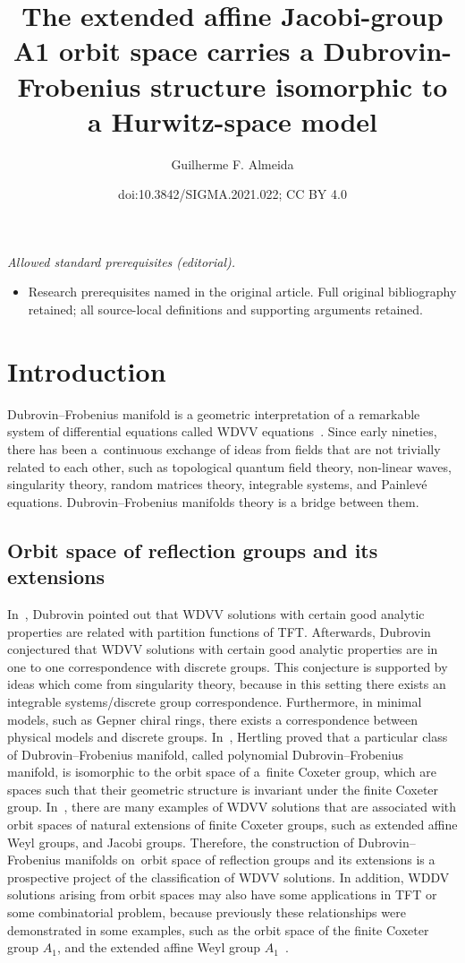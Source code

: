 \documentclass[10pt,a4paper]{amsart}
\title{The extended affine Jacobi-group A1 orbit space carries a Dubrovin-Frobenius structure isomorphic to a Hurwitz-space model}
\author{Guilherme F. Almeida}
\date{doi:10.3842/SIGMA.2021.022; CC BY 4.0}
\numberwithin{equation}{section}
\begin{document}
\maketitle
\noindent\textit{Allowed standard prerequisites (editorial).}\begin{itemize}
\item Research prerequisites named in the original article. Full original bibliography retained; all source-local definitions and supporting arguments retained.
\end{itemize}\medskip
\section{Introduction}
 Dubrovin--Frobenius manifold is a geometric interpretation of a remarkable system of differential equations called WDVV equations~\cite{B.Dubrovin2}. Since early nineties, there has been a~continuous exchange of ideas from fields that are not trivially related to each other, such as topological quantum field theory, non-linear waves, singularity theory, random matrices theory, integrable systems, and Painlev\'e equations. Dubrovin--Frobenius manifolds theory is a bridge between them.

\subsection{Orbit space of reflection groups and its extensions}
In~\cite{B.Dubrovin2}, Dubrovin pointed out that WDVV solutions with certain good analytic properties are rela\-ted with partition functions of TFT. Afterwards, Dubrovin conjectured that WDVV solutions with certain good analytic properties are in one to one correspondence with discrete groups. This conjecture is supported by ideas which come from singularity theory, because in this setting there exists an integrable systems/discrete group correspondence. Furthermore, in minimal models, such as Gepner chiral rings, there exists a correspondence between physical models and discrete groups.
In~\cite{C.Hertling}, Hertling proved that a particular class of Dubrovin--Frobenius manifold, called polynomial Dubrovin--Frobenius manifold, is isomorphic to the orbit space of a~finite Coxeter group, which are spaces such that their geometric structure is invariant under the finite Coxeter group.
In~\cite{BertolaM.1,BertolaM.2, B.Dubrovin2, B.Dubrovin1, B.DubrovinI.A.B.StrachanY.ZhangD.Zuo, B.DubrovinandY.Zhang, D.Zuo}, there are many examples of WDVV solutions that are associated with orbit spaces of natural extensions of finite Coxeter groups, such as
extended affine Weyl groups, and Jacobi groups. Therefore, the construction of Dubrovin--Frobenius manifolds on~orbit space of reflection groups and its extensions is a prospective project of the classification of WDVV solutions. In addition, WDDV solutions arising from orbit spaces may also have some applications in TFT or some combinatorial problem, because previously these relationships were demonstrated in some examples, such as the orbit space of the finite Coxeter group $A_1$, and the extended affine Weyl group $A_1$~\cite{Dubrovin3,B.DubrovinandY.Zhang2}.
\end{document}
